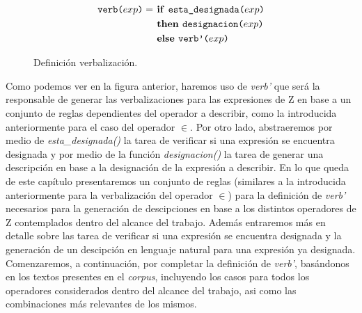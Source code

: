 \begin{figure}[H]
\begin{align*}
\nlgfun{verb($exp$)} = & \text{\textbf{ if }} \nlgfun{esta\_designada($exp$)} \\
 & \text{\textbf{ then }} \nlgfun{designacion($exp$)} \\
 & \text{\textbf{ else }} \nlgfun{verb'($exp$)} \\
\end{align*}
\caption{Definición verbalización.}
\label{fig:def-verb}
\end{figure}


Como podemos ver en la figura anterior, haremos uso de \emph{verb'} que será la responsable de generar las verbalizaciones para las expresiones de Z en base a un conjunto de reglas dependientes del operador a describir, como la introducida anteriormente para el caso del operador $\in$. Por otro lado, abstraeremos por medio de \emph{esta\_designada()} la tarea de verificar si una expresión se encuentra designada y por medio de la función \emph{designacion()} la tarea de generar una descripción en base a la designación de la expresión a describir. En lo que queda de este capítulo presentaremos un conjunto de reglas (similares a la introducida anteriormente para la verbalización del operador $\in$) para la definición de \emph{verb'} necesarios para la generación de descipciones en base a los distintos operadores de Z contemplados dentro del alcance del trabajo. Además entraremos más en detalle sobre las tarea de verificar si una expresión se encuentra designada y la generación de un descipción en lenguaje natural para una expresión ya designada. Comenzaremos, a continuación, por completar la definición de \emph{verb'}, basándonos en los textos presentes en el \emph{corpus}, incluyendo los casos para todos los operadores considerados dentro del alcance del trabajo, asi como las combinaciones más relevantes de los mismos. %

